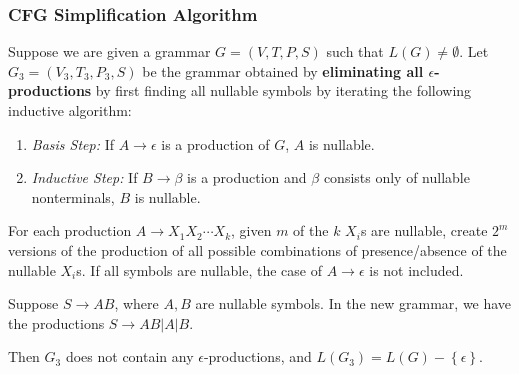 \subsubsection{CFG Simplification Algorithm}
Suppose we are given a grammar $G=\left( V,T,P,S \right)$ such that
$L(G)\neq\emptyset $. Let $G_3=\left( V_3,T_3,P_3,S \right)$ be the grammar obtained by
\textbf{eliminating all $\epsilon$-productions} by first finding all nullable
symbols by iterating the following inductive algorithm:
\begin{enumerate}
  \item \textit{Basis Step:} If $A\to\epsilon$ is a production of $G$, $A$
    is nullable.
  \item \textit{Inductive Step:} If $B\to \beta$ is a production and
    $\beta$ consists only of nullable nonterminals, $B$ is nullable.
\end{enumerate}
For each production $A\to X_1X_2\cdots X_k$, given $m$ of the $k$ $X_i$s
are nullable, create $2^{m}$ versions of the production of all possible
combinations of presence/absence of the nullable $X_i$s. If all symbols are
nullable, the case of $A\to\epsilon$ is not included.
\begin{example}
  Suppose $S\to AB$, where $A,B$ are nullable symbols. In the new grammar,
  we have the productions $S\to AB | A | B$.
\end{example}
Then $G_3$ does not contain any $\epsilon$-productions, and
$L(G_3)=L(G)-\left\{ \epsilon \right\} $.\\

